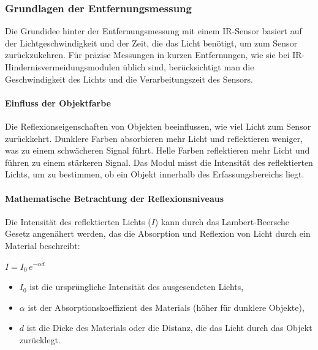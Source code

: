 \documentclass{vorlage-design-main}
\begin{document}
\hypertarget{grundlagen-der-entfernungsmessung}{%
\subsubsection{Grundlagen der
Entfernungsmessung}\label{grundlagen-der-entfernungsmessung}}

Die Grundidee hinter der Entfernungsmessung mit einem IR-Sensor basiert
auf der Lichtgeschwindigkeit und der Zeit, die das Licht benötigt, um
zum Sensor zurückzukehren. Für präzise Messungen in kurzen Entfernungen,
wie sie bei IR-Hindernisvermeidungsmodulen üblich sind, berücksichtigt
man die Geschwindigkeit des Lichts und die Verarbeitungszeit des
Sensors.

\hypertarget{einfluss-der-objektfarbe}{%
\paragraph{Einfluss der Objektfarbe}\label{einfluss-der-objektfarbe}}

Die Reflexionseigenschaften von Objekten beeinflussen, wie viel Licht
zum Sensor zurückkehrt. Dunklere Farben absorbieren mehr Licht und
reflektieren weniger, was zu einem schwächeren Signal führt. Helle
Farben reflektieren mehr Licht und führen zu einem stärkeren Signal. Das
Modul misst die Intensität des reflektierten Lichts, um zu bestimmen, ob
ein Objekt innerhalb des Erfassungsbereichs liegt.

\hypertarget{mathematische-betrachtung-der-reflexionsniveaus}{%
\paragraph{Mathematische Betrachtung der
Reflexionsniveaus}\label{mathematische-betrachtung-der-reflexionsniveaus}}

Die Intensität des reflektierten Lichts ($I$) kann durch das
Lambert-Beersche Gesetz angenähert werden, das die Absorption und
Reflexion von Licht durch ein Material beschreibt:

$I = I_0 \, e^{-\alpha d}$

\begin{itemize}

\item
  $I_0$ ist die ursprüngliche Intensität des ausgesendeten Lichts,
\item
  $\alpha$ ist der Absorptionskoeffizient des Materials (höher für
  dunklere Objekte),
\item
  $d$ ist die Dicke des Materials oder die Distanz, die das Licht
  durch das Objekt zurücklegt.
\end{itemize}
\end{document}
